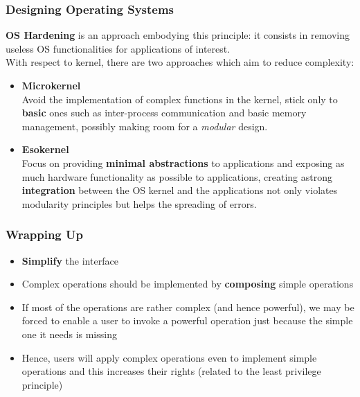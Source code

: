 \subsubsection{Designing Operating Systems}
\textbf{OS Hardening} is an approach embodying this principle:
it consists in removing useless OS functionalities for applications
of interest.\\
With respect to kernel, there are two approaches which aim to reduce complexity:
\begin{itemize}
   \item \textbf{Microkernel}\\
   Avoid the implementation of complex functions in the kernel,
   stick only to \textbf{basic} ones such as inter-process communication and basic memory management,
   possibly making room for a \textit{modular} design.
   \item \textbf{Esokernel}\\
   Focus on providing \textbf{minimal abstractions} to applications and exposing as much hardware functionality as possible to applications,
   creating astrong \textbf{integration} between the OS kernel and the
   applications not only violates modularity principles
   but helps the spreading of errors.
\end{itemize}

\subsubsection{Wrapping Up}
\begin{itemize}
   \color{darkgreen}
   \item \textbf{Simplify} the interface
   \item Complex operations should be implemented by \textbf{composing}
   simple operations

\end{itemize}
\begin{itemize}
   \color{darkred}
   \item If most of the operations are rather complex (and hence
   powerful), we may be forced to enable a user to invoke a
   powerful operation just because the simple one it needs is
   missing
   \item Hence, users will apply complex operations even to
   implement simple operations and this increases their rights
   (related to the least privilege principle)
\end{itemize}

